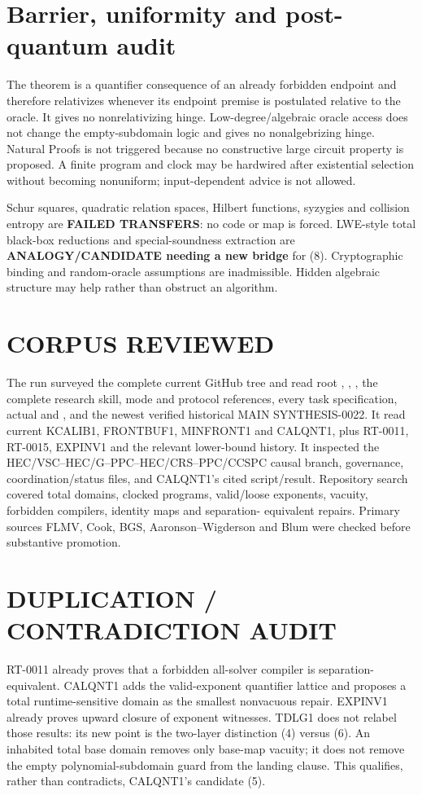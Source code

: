 \documentclass[11pt]{article}
\begin{document}
\section{Barrier, uniformity and post-quantum audit}
The theorem is a quantifier consequence of an already forbidden endpoint and
therefore relativizes whenever its endpoint premise is postulated relative
to the oracle.  It gives no nonrelativizing hinge.  Low-degree/algebraic
oracle access does not change the empty-subdomain logic and gives no
nonalgebrizing hinge.  Natural Proofs is not triggered because no
constructive large circuit property is proposed.  A finite program and
clock may be hardwired after existential selection without becoming
nonuniform; input-dependent advice is not allowed.

Schur squares, quadratic relation spaces, Hilbert functions, syzygies and
collision entropy are \textbf{FAILED TRANSFERS}: no code or map is forced.
LWE-style total black-box reductions and special-soundness extraction are
\textbf{ANALOGY/CANDIDATE needing a new bridge} for (8).  Cryptographic
binding and random-oracle assumptions are inadmissible.  Hidden algebraic
structure may help rather than obstruct an algorithm.

\section{CORPUS REVIEWED}
The run surveyed the complete current GitHub tree and read root
, , , the complete research
skill, mode and protocol references, every task specification, actual
 and , and the newest verified historical
MAIN SYNTHESIS-0022.  It read current KCALIB1, FRONTBUF1, MINFRONT1 and
CALQNT1, plus RT-0011, RT-0015, EXPINV1 and the relevant lower-bound history.
It inspected the HEC/VSC--HEC/G--PPC--HEC/CRS--PPC/CCSPC causal branch,
governance, coordination/status files, and CALQNT1's cited script/result.
Repository search covered total domains, clocked programs, valid/loose
exponents, vacuity, forbidden compilers, identity maps and separation-
equivalent repairs.  Primary sources FLMV, Cook, BGS, Aaronson--Wigderson and
Blum were checked before substantive promotion.

\section{DUPLICATION / CONTRADICTION AUDIT}
RT-0011 already proves that a forbidden all-solver compiler is separation-
equivalent.  CALQNT1 adds the valid-exponent quantifier lattice and proposes
a total runtime-sensitive domain as the smallest nonvacuous repair.  EXPINV1
already proves upward closure of exponent witnesses.  TDLG1 does not relabel
those results: its new point is the two-layer distinction (4) versus (6).
An inhabited total base domain removes only base-map vacuity; it does not
remove the empty polynomial-subdomain guard from the landing clause.  This
qualifies, rather than contradicts, CALQNT1's candidate (5).
\end{document}
